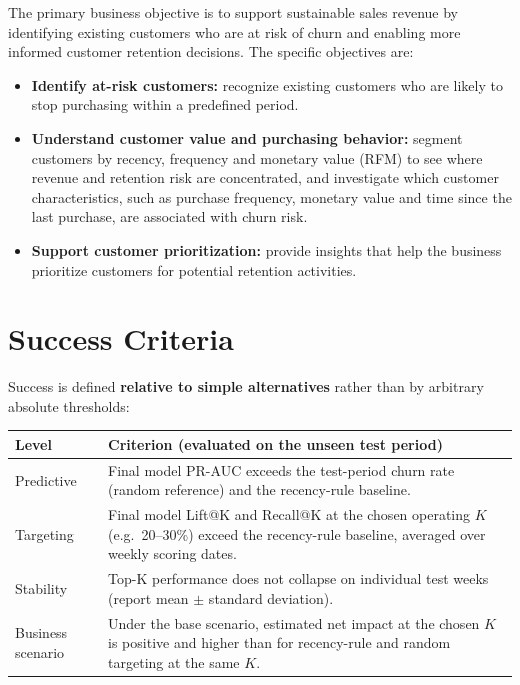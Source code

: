 The primary business objective is to support sustainable sales revenue by identifying existing customers who are at risk of churn and enabling more informed customer retention decisions. The specific objectives are:

\begin{itemize}
    \item \textbf{Identify at-risk customers:} recognize existing customers who are likely to stop purchasing within a predefined period.
    \item \textbf{Understand customer value and purchasing behavior:} segment customers by recency, frequency and monetary value (RFM) to see where revenue and retention risk are concentrated, and investigate which customer characteristics, such as purchase frequency, monetary value and time since the last purchase, are associated with churn risk.
    \item \textbf{Support customer prioritization:} provide insights that help the business prioritize customers for potential retention activities.
\end{itemize}

\section{Success Criteria}
\label{sec:2-6}

Success is defined \textbf{relative to simple alternatives} rather than by arbitrary absolute thresholds:

\begin{center}
\begin{tabular}{@{}p{3cm}p{11.5cm}@{}}
    \toprule
    Level & Criterion (evaluated on the unseen test period) \\
    \midrule
    Predictive & Final model PR-AUC exceeds the test-period churn rate (random reference) and the recency-rule baseline. \\
    Targeting & Final model Lift@K and Recall@K at the chosen operating $K$ (e.g.\ 20--30\%) exceed the recency-rule baseline, averaged over weekly scoring dates. \\
    Stability & Top-K performance does not collapse on individual test weeks (report mean $\pm$ standard deviation). \\
    Business scenario & Under the base scenario, estimated net impact at the chosen $K$ is positive and higher than for recency-rule and random targeting at the same $K$. \\
    \bottomrule
\end{tabular}
\end{center}

